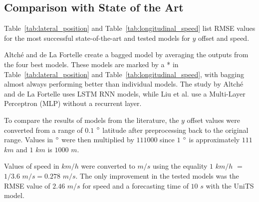 \documentclass[preprint,12pt]{elsarticle}
\begin{document}
\subsection{Comparison with State of the Art}

Table~\ref{tab:lateral_position} and Table~\ref{tab:longitudinal_speed} list RMSE values for the most successful state-of-the-art and tested models for $y$ offset and speed. 

Altché and de La Fortelle create a bagged model by averaging the outputs from the four best models. These models are marked by a * in Table~\ref{tab:lateral_position} and Table~\ref{tab:longitudinal_speed}, with bagging almost always performing better than individual models. The study by Altché and de La Fortelle \cite{altche2017lstm} uses LSTM RNN models, while Liu et al. \cite{liu2014vehicle} use a Multi-Layer Perceptron (MLP) without a recurrent layer. 

To compare the results of models from the literature, the $y$ offset values were converted from a range of $0.1$ $\degree$ latitude after preprocessing back to the original range. Values in $\degree$ were then multiplied by $111000$ since $1$ $\degree$ is approximately $111$ $km$ and $1$ $km$ is $1000$ $m$. 

Values of speed in $km/h$ were converted to $m/s$ using the equality $1$ $km/h$ $=$ $1 / 3.6$ $m/s = 0.278$ $m/s$. The only improvement in the tested models was the RMSE value of $2.46$ $m/s$ for speed and a forecasting time of $10$ $s$ with the UniTS model.
\end{document}

